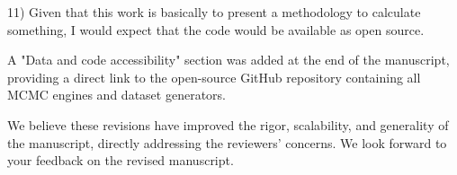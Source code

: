 \documentclass[11pt,a4paper]{article}
\begin{document}
\begin{reviewercomment}
11) Given that this work is basically to present a methodology to calculate something, I would expect that the code would be available as open source.
\end{reviewercomment}

A "Data and code accessibility" section was added at the end of the manuscript, providing a direct link to the open-source GitHub repository containing all MCMC engines and dataset generators.

\vspace{2em}
\noindent We believe these revisions have improved the rigor, scalability, and generality of the manuscript, directly addressing the reviewers' concerns. We look forward to your feedback on the revised manuscript.
\end{document}
